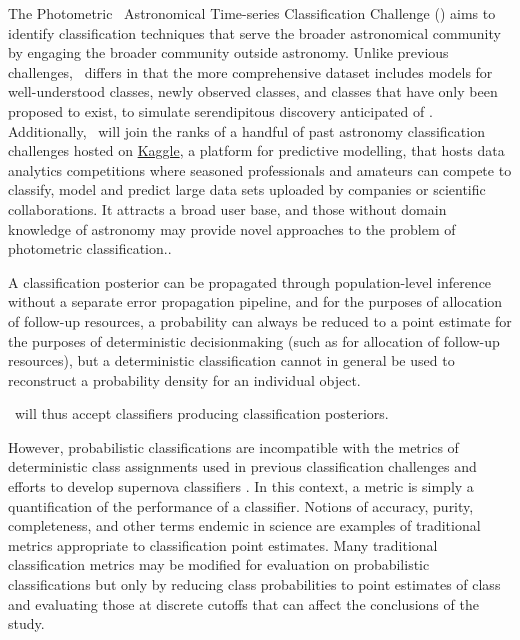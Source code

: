 The Photometric \lsst\ Astronomical Time-series Classification Challenge (\plasticc) aims to identify classification techniques that serve the broader astronomical community by engaging the broader community outside astronomy.
Unlike previous challenges, \plasticc\ differs in that the more comprehensive dataset includes models for well-understood classes, newly observed classes, and classes that have only been proposed to exist, to simulate serendipitous discovery anticipated of \lsst.
Additionally, \plasticc\ will join the ranks of a handful of past astronomy classification challenges hosted on \href{https://www.kaggle.com/competitions}{Kaggle}, a platform for predictive modelling, that hosts data analytics competitions where seasoned professionals and amateurs can compete to classify, model and predict large data sets uploaded by companies or scientific collaborations. It attracts a broad user base, and those without domain knowledge of astronomy may provide novel approaches to the problem of photometric classification..

A classification posterior can be propagated through population-level inference without a separate error propagation pipeline, and for the purposes of allocation of follow-up resources, a probability can always be reduced to a point estimate for the purposes of deterministic decisionmaking (such as for allocation of follow-up resources), but a deterministic classification cannot in general be used to reconstruct a probability density for an individual object.

\plasticc\ will thus accept classifiers producing classification posteriors.

However, probabilistic classifications are incompatible with the metrics of deterministic class assignments used in previous classification challenges \cite{kessler_supernova_2010, kessler_results_2010} and efforts to develop supernova classifiers \cite{2018ApJS..236....9N}.
In this context, a metric is simply a quantification of the performance of a classifier.
Notions of accuracy, purity, completeness, and other terms endemic in science are examples of traditional metrics appropriate to classification point estimates.
Many traditional classification metrics may be modified for evaluation on probabilistic classifications \cite{lochner_photometric_2016, moller_photometric_2016, hon_deep_2017, hon_detecting_2018, 2011arXiv1108.4696G} but only by reducing class probabilities to point estimates of class and evaluating those at discrete cutoffs that can affect the conclusions of the study.

